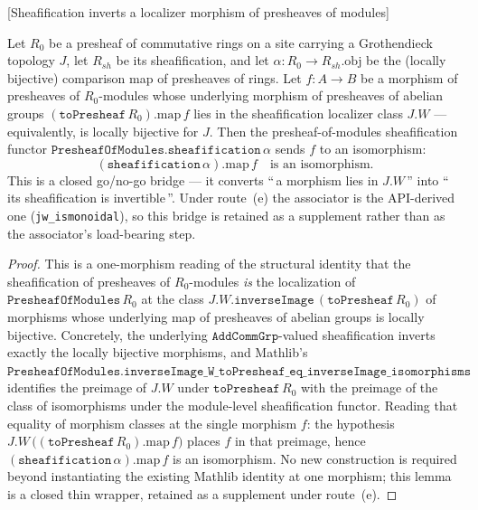 \begin{lemma}

[Sheafification inverts a localizer morphism of presheaves of modules]
  \label{mk-lem:isiso_sheafification_map_of_W}
  \leanok

  Let \(R_0\) be a presheaf of commutative rings on a site carrying a
  Grothendieck topology \(J\), let \(R_{sh}\) be its sheafification, and let
  \(\alpha : R_0 \to R_{sh}.\mathrm{obj}\) be the (locally bijective) comparison
  map of presheaves of rings. Let \(f : A \to B\) be a morphism of presheaves of
  \(R_0\)-modules whose underlying morphism of presheaves of abelian groups
  \((\mathtt{toPresheaf}\,R_0).\mathrm{map}\,f\) lies in the sheafification
  localizer class \(J.W\) --- equivalently, is locally bijective for \(J\). Then
  the presheaf-of-modules sheafification functor
  \(\mathtt{PresheafOfModules.sheafification}\,\alpha\) sends \(f\) to an
  isomorphism:
  \[
    (\mathtt{sheafification}\,\alpha).\mathrm{map}\,f
    \quad\text{is an isomorphism.}
  \]
  This is a closed go/no-go bridge --- it converts ``\,a morphism lies in
  \(J.W\)\,'' into ``\,its sheafification is invertible\,''. Under route~(e) the
  associator is the API-derived one (\texttt{jw\_ismonoidal}), so this bridge is
  retained as a supplement rather than as the associator's load-bearing step.
\end{lemma}

\begin{proof}
  \leanok

This is a one-morphism reading of the structural identity that the
  sheafification of presheaves of \(R_0\)-modules \emph{is} the localization of
  \(\mathtt{PresheafOfModules}\,R_0\) at the class
  \(J.W.\mathtt{inverseImage}\,(\mathtt{toPresheaf}\,R_0)\) of morphisms whose
  underlying map of presheaves of abelian groups is locally bijective. Concretely,
  the underlying \(\mathtt{AddCommGrp}\)-valued sheafification inverts exactly the
  locally bijective morphisms, and Mathlib's
  \(\mathtt{PresheafOfModules.inverseImage\_W\_toPresheaf\_eq\_inverseImage\_%
  isomorphisms}\) identifies the preimage of \(J.W\) under
  \(\mathtt{toPresheaf}\,R_0\) with the preimage of the class of isomorphisms under
  the module-level sheafification functor. Reading that equality of morphism
  classes at the single morphism \(f\): the hypothesis
  \(J.W\,\bigl((\mathtt{toPresheaf}\,R_0).\mathrm{map}\,f\bigr)\) places \(f\) in
  that preimage, hence \((\mathtt{sheafification}\,\alpha).\mathrm{map}\,f\) is an
  isomorphism. No new construction is required beyond instantiating the existing
  Mathlib identity at one morphism; this lemma is a closed thin wrapper, retained
  as a supplement under route~(e).
\end{proof}


